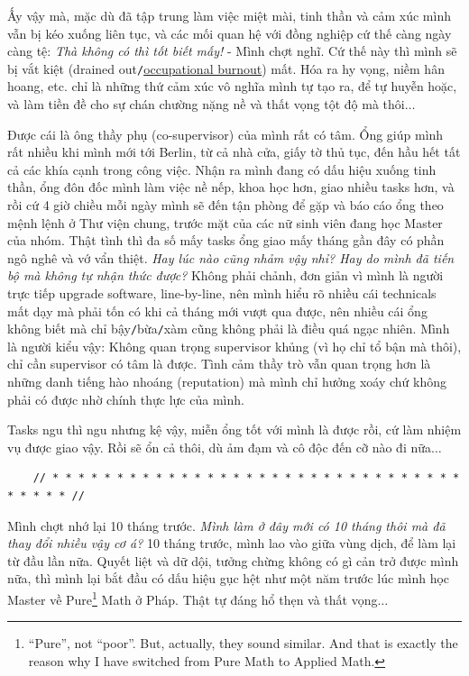 \documentclass[12pt]{article}
\numberwithin{equation}{section}
\begin{document}
Ấy vậy mà, mặc dù đã tập trung làm việc miệt mài, tinh thần và cảm xúc mình vẫn bị kéo xuống liên tục, và các mối quan hệ với đồng nghiệp cứ thế càng ngày càng tệ: \textit{Thà không có thì tốt biết mấy!} - Mình chợt nghĩ. Cứ thế này thì mình sẽ bị vắt kiệt (drained out\texttt{/}\href{https://en.wikipedia.org/wiki/Occupational_burnout}{occupational burnout}) mất. Hóa ra hy vọng, niềm hân hoang, etc. chỉ là những thứ cảm xúc vô nghĩa mình tự tạo ra, để tự huyễn hoặc, và làm tiền đề cho sự chán chường nặng nề và thất vọng tột độ mà thôi$\ldots$

Được cái là ông thầy phụ (co-supervisor) của mình rất có tâm. Ổng giúp mình rất nhiều khi mình mới tới Berlin, từ cả nhà cửa, giấy tờ thủ tục, đến hầu hết tất cả các khía cạnh trong công việc. Nhận ra mình đang có dấu hiệu xuống tinh thần, ổng đôn đốc mình làm việc nề nếp, khoa học hơn, giao nhiều tasks hơn, và rồi cứ 4 giờ chiều mỗi ngày mình sẽ đến tận phòng để gặp và báo cáo ổng theo mệnh lệnh ở Thư viện chung, trước mặt của các nữ sinh viên đang học Master của nhóm. Thật tình thì đa số mấy tasks ổng giao mấy tháng gần đây có phần ngô nghê và vớ vẩn thiệt. \textit{Hay lúc nào cũng nhảm vậy nhỉ? Hay do mình đã tiến bộ mà không tự nhận thức được?} Không phải chảnh, đơn giản vì mình là người trực tiếp upgrade software, line-by-line, nên mình hiểu rõ nhiều cái technicals mất dạy mà phải tốn có khi cả tháng mới vượt qua được, nên nhiều cái ổng không biết mà chỉ bậy\texttt{/}bừa\texttt{/}xàm cũng không phải là điều quá ngạc nhiên. Mình là người kiểu vậy: Không quan trọng supervisor khủng (vì họ chỉ tổ bận mà thôi), chỉ cần supervisor có tâm là được. Tình cảm thầy trò vẫn quan trọng hơn là những danh tiếng hào nhoáng (reputation) mà mình chỉ hưởng xoáy chứ không phải có được nhờ chính thực lực của mình.

Tasks ngu thì ngu nhưng kệ vậy, miễn ổng tốt với mình là được rồi, cứ làm nhiệm vụ được giao vậy. Rồi sẽ ổn cả thôi, dù ảm đạm và cô độc đến cỡ nào đi nữa$\ldots$

\begin{verbatim}
    // * * * * * * * * * * * * * * * * * * * * * * * * * * * * * * * * * * * * * //
\end{verbatim}

\noindent
{} Mình chợt nhớ lại 10 tháng trước. \textit{Mình làm ở đây mới có 10 tháng thôi mà đã thay đổi nhiều vậy cơ á?} 10 tháng trước, mình lao vào giữa vùng dịch, để làm lại từ đầu lần nữa. Quyết liệt và dữ dội, tưởng chừng không có gì cản trở được mình nữa, thì mình lại bắt đầu có dấu hiệu gục hệt như một năm trước lúc mình học Master về Pure\footnote{``Pure'', not ``poor''. But, actually, they sound similar. And that is exactly the reason why I have switched from Pure Math to Applied Math.} Math ở Pháp. Thật tự đáng hổ thẹn và thất vọng$\ldots$
\end{document}
